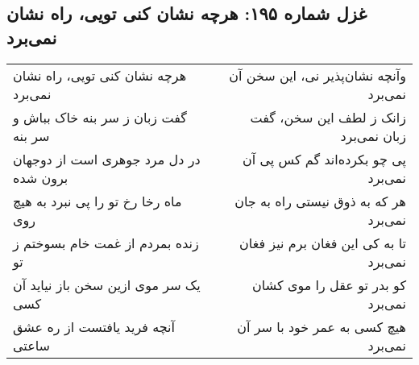\begin{center}
\section*{غزل شماره ۱۹۵: هرچه نشان کنی تویی، راه نشان نمی‌برد}
\label{sec:195}
\begin{longtable}{l p{0.5cm} r}
هرچه نشان کنی تویی، راه نشان نمی‌برد
&&
وآنچه نشان‌پذیر نی، این سخن آن نمی‌برد
\\
گفت زبان ز سر بنه خاک بباش و سر بنه
&&
زانک ز لطف این سخن، گفت زبان نمی‌برد
\\
در دل مرد جوهری است از دوجهان برون شده
&&
پی چو بکرده‌اند گم کس پی آن نمی‌برد
\\
ماه رخا رخ تو را پی نبرد به هیچ روی
&&
هر که به ذوق نیستی راه به جان نمی‌برد
\\
زنده بمردم از غمت خام بسوختم ز تو
&&
تا به کی این فغان برم نیز فغان نمی‌برد
\\
یک سر موی ازین سخن باز نیاید آن کسی
&&
کو بدر تو عقل را موی کشان نمی‌برد
\\
آنچه فرید یافتست از ره عشق ساعتی
&&
هیچ کسی به عمر خود با سر آن نمی‌برد
\\
\end{longtable}
\end{center}
